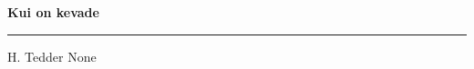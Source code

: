 \documentclass[10pt]{book}
\begin{document}
{
  \samepage
  \raggedbottom
  \raggedright
  \sloppy


  \vspace{0.2in}

  \noindent\begin{minipage}{.1\textwidth}
    \hfill\vspace{0.1in}
  \end{minipage}%
  \noindent\begin{minipage}{.8\textwidth}
    \centering
    \bfseries
    \large Kui on kevade
  \end{minipage}%
  \noindent\begin{minipage}{.1\textwidth}
      \hfill\vspace{0.1in}
  \end{minipage}

  \nopagebreak[4]
  \vspace{0.1in}
  \nopagebreak[4]
  \hrule height 0.05ex
  \nopagebreak[4]
  \vspace{-0.05in}

  {\footnotesize H. Tedder \hfill None }\\
  \vspace{0.01in}



}
\end{document}
